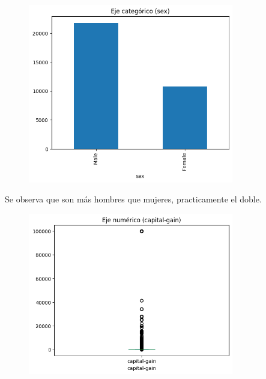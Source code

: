 \documentclass{article}
\begin{document}
	\begin{figure}[H]
		\centering
		\includegraphics[width=0.8\textwidth]{sex.png}
	\end{figure}
	
	Se observa que son más hombres que mujeres, practicamente el doble.
	
	\begin{figure}[H]
		\centering
		\includegraphics[width=0.8\textwidth]{capital-gain.png}  
	\end{figure}
	
\end{document}
